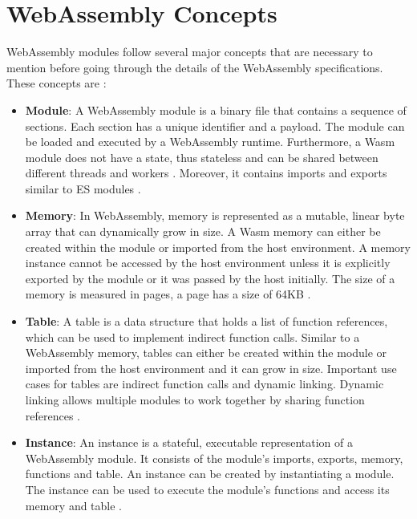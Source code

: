 \section{WebAssembly Concepts}
\label{sec:wasm-concepts}

WebAssembly modules follow several major concepts that are necessary to mention before going through the details of the WebAssembly specifications. These concepts are \cite{mozillacorporation_2023_webassembly}:

\begin{itemize}
  \item \textbf{Module}: A WebAssembly module is a binary file that contains a sequence of sections. Each section has a unique identifier and a payload. The module can be loaded and executed by a WebAssembly runtime. Furthermore, a Wasm module does not have a state, thus stateless and can be shared between different threads and workers \cite[sec. 1.2.1]{webassemblycommunitygroup_2023_webassembly}. Moreover, it contains imports and exports similar to ES modules \cite{mozillafoundation_javascript}.
  \item \textbf{Memory}: In WebAssembly, memory is represented as a mutable, linear byte array that can dynamically grow in size. A Wasm memory can either be created within the module or imported from the host environment. A memory instance cannot be accessed by the host environment unless it is explicitly exported by the module or it was passed by the host initially. The size of a memory is measured in pages, a page has a size of 64KB \cite[sec. 4.2.8]{webassemblycommunitygroup_2023_webassembly}. 
  \item \textbf{Table}: A table is a data structure that holds a list of function references, which can be used to implement indirect function calls. Similar to a WebAssembly memory, tables can either be created within the module or imported from the host environment and it can grow in size. Important use cases for tables are indirect function calls and dynamic linking. Dynamic linking allows multiple modules to work together by sharing function references \cite{webassemblycommunitygroup_2023_webassembly,sletten_2021_webassembly}.
  \item \textbf{Instance}: An instance is a stateful, executable representation of a WebAssembly module. It consists of the module's imports, exports, memory, functions and table. An instance can be created by instantiating a module. The instance can be used to execute the module's functions and access its memory and table \cite[sec. 1.2.2]{webassemblycommunitygroup_2023_webassembly}. 
\end{itemize}
